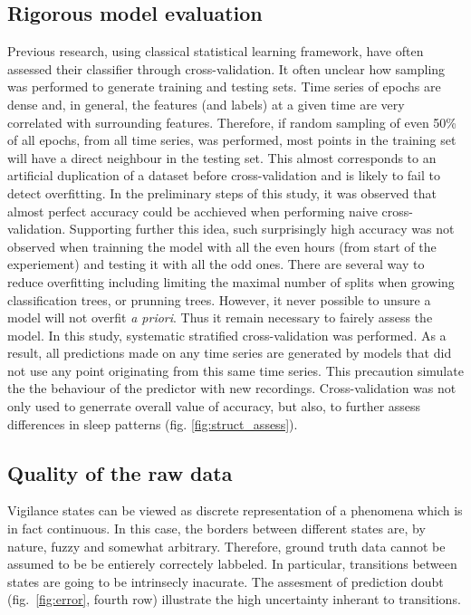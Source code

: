 \subsection{Rigorous model evaluation} 

Previous research, using classical statistical learning framework,
have often assessed their classifier through cross-validation.
It often unclear how sampling was performed to generate training and testing sets.
Time series of epochs are dense and, in general,
the features (and labels) at a given time are very correlated with surrounding features.
Therefore, if random sampling of even 50\% of all epochs, from all time series, was performed,
most points in the training set will have a direct neighbour in the testing set.
This almost corresponds to an artificial duplication of a dataset before cross-validation and is likely to fail to detect overfitting.
In the preliminary steps of this study, it was observed that almost perfect accuracy could be acchieved when performing naive cross-validation.
Supporting further this idea, such surprisingly high accuracy was not observed when trainning the model
with all the even hours (from start of the experiement) and testing it with all the odd ones.
There are several way to reduce overfitting including limiting the maximal number of splits when growing classification trees, or prunning trees.
However, it never possible to unsure a model will not overfit \emph{a priori}. 
Thus it remain necessary to fairely assess the model.
In this study, systematic stratified cross-validation was performed.
As a result, all predictions made on any time series are generated by models
that did not use any point originating from this same time series. This precaution simulate the the behaviour of the predictor with new recordings.
Cross-validation was not only used to generrate overall value of accuracy, but also, to further assess differences in sleep patterns (fig. \ref{fig:struct_assess}).

\subsection{Quality of the raw data} 

Vigilance states can be viewed as discrete representation of a phenomena which is in fact continuous.
In this case, the borders between different states are, by nature, fuzzy and somewhat arbitrary.
Therefore, ground truth data cannot be assumed to be be entierely correctely labbeled.
In particular, transitions between states are going to be intrinsecly inacurate.
The assesment of prediction doubt (fig.~\ref{fig:error}, fourth row) illustrate the high uncertainty inherant to transitions. 


